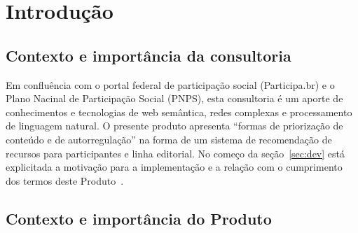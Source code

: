 \documentclass[12pt]{article}
\newcommand{\PalavrasChave}{reconhecimento de padrões, redes complexas, processamento de linguagem natural, participação social}
\begin{document}



\tableofcontents
\newpage


\begin{abstract}
Este documento descreve rotinas de priorização de conteúdo e de autorregulação para o portal federal de participação social. Como parte da exposição e do Produto, foi implementado um sistema de recomendação de participantes para outros participantes e linha editorial do participa.br. Este sistema está online e visa atender a requisitos como os do ActionItem 3234 do Noosfero, que prevê recomendação de participantes, comunidades e empreendimentos. Como generalização da proposta, é delineada  recomendação de recursos como trilhas, artigos, comentários e palavras. O consultor e equipe do participa.br entendem que a disponibilização destes recursos em formato aberto - e com documentações reativas para fácil geração de derivados, críticas e propostas - é instrumental para a democracia participativa e online, promovendo empoderamento e transparência.\\

{\bf Palavras-chave:} \PalavrasChave.
\end{abstract}
\newpage

\section{Introdução}
\subsection{Contexto e importância da consultoria}
Em confluência com o portal federal de participação social (Participa.br) e o Plano Nacinal de Participação Social (PNPS), esta consultoria é um aporte de conhecimentos e tecnologias de web semântica, redes complexas e processamento de linguagem natural. O presente produto apresenta ``formas de priorização de conteúdo e de autorregulação'' na forma de um sistema de recomendação de recursos para participantes e linha editorial. No começo da seção~\ref{sec:dev} está explicitada a motivação para a implementação e a relação com o cumprimento dos termos deste Produto~\cite{termoReferencia}.

\subsection{Contexto e importância do Produto}
\end{document}
